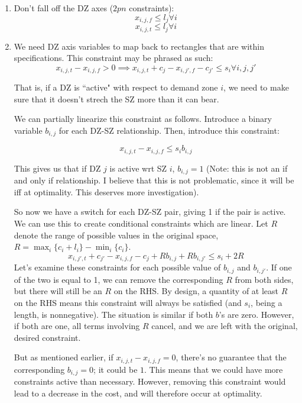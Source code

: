 \documentclass[a4paper]{article}
\begin{document}
\begin{enumerate}
    \item Don't fall off the DZ axes ($2pn$ constraints):
        $$x_{i,j,f} \leq l_j \forall i$$
        $$x_{i,j,t} \leq l_j \forall i$$
    \item We need DZ axis variables to map back to rectangles that are within specifications. This constraint may be phrased as such:
        $$
        x_{i,j,t} - x_{i,j,f} > 0 \implies x_{i,j,t} + c_{j} - x_{i,j',f} - c_{j'} \leq s_i \forall i,j,j'
        $$

        That is, if a DZ is ``active"  with respect to demand zone $i$, we need to make sure that it doesn't strech the SZ more than it can bear. 

        We can partially linearize this constraint as follows. Introduce a binary variable $b_{i,j}$ for each DZ-SZ relationship. Then, introduce this constraint:
        
        $$
        x_{i,j,t} - x_{i,j,f} \leq s_i b_{i,j}
        $$

        This gives us that if DZ $j$ is active wrt SZ $i$, $b_{i,j} = 1$ (Note: this is not an if and only if relationship. I believe that this is not problematic, since it will be iff at optimality. This deserves more investigation). 

        So now we have a switch for each DZ-SZ pair, giving 1 if the pair is active. We can use this to create conditional constraints which are linear. Let $R$ denote the range of possible values in the original space, $R = \max_{i}\{c_i + l_i\} - \min_{i}\{c_i\}$.
        $$
        x_{i,j',t} + c_{j'} - x_{i,j,f} - c_j + Rb_{i,j} + Rb_{i,j'} \leq s_i + 2R
        $$
        Let's examine these constraints for each possible value of $b_{i,j}$ and $b_{i,j'}$. If one of the two is equal to 1, we can remove the corresponding $R$ from both sides, but there will still be an $R$ on the RHS. By design, a quantity of at least $R$ on the RHS means this constraint will always be satisfied (and $s_i$, being a length, is nonnegative). The situation is similar if both $b$'s are zero. However, if both are one, all terms involving $R$ cancel, and we are left with the original, desired constraint. 

        But as mentioned earlier, if $x_{i,j,t} - x_{i,j,f} = 0$, there's no guarantee that the corresponding $b_{i,j} = 0$; it could be $1$. This means that we could have more constraints active than necessary. However, removing this constraint would lead to a decrease in the cost, and will therefore occur at optimality.


\end{enumerate}
\end{document}
